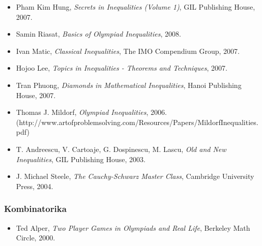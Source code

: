 \begin{itemize}
  \item Pham Kim Hung, \emph{Secrets in Inequalities (Volume 1)}, GIL
    Publishing House, 2007.
  \item Samin Riasat, \emph{Basics of Olympiad Inequalities}, 2008.
  \item Ivan Matic, \emph{Classical Inequalities}, The IMO Compendium
    Group, 2007.
  \item Hojoo Lee, \emph{Topics in Inequalities - Theorems and
    Techniques}, 2007.
  \item Tran Phuong, \emph{Diamonds in Mathematical Inequalities},
    Hanoi Publishing House, 2007.
  \item Thomas J. Mildorf, \emph{Olympiad Inequalities}, 2006.\\
    (http://www.artofproblemsolving.com/Resources/Papers/MildorfInequalities.pdf)
  \item T. Andreescu, V. Cartoaje, G. Dospinescu, M. Lascu, \emph{Old
    and New Inequalities}, GIL Publishing House, 2003.
  \item J. Michael Steele, \emph{The Cauchy-Schwarz Master Class},
    Cambridge University Press, 2004.
\end{itemize}

\subsubsection{Kombinatorika}
\begin{itemize}
  \item Ted Alper, \emph{Two Player Games in Olympiads and Real Life},
    Berkeley Math Circle, 2000.
\end{itemize}

